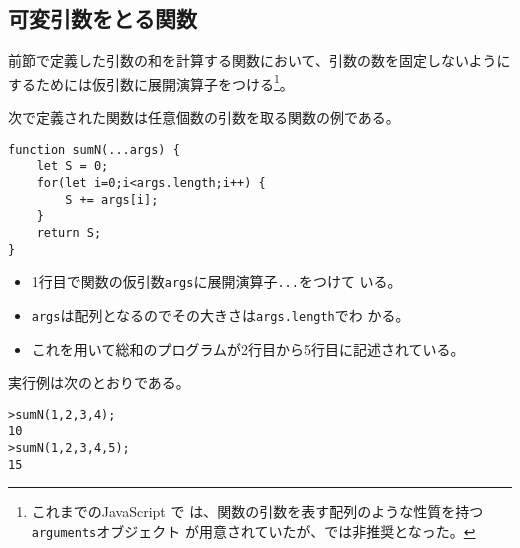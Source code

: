 \subsection{可変引数をとる関数}
前節で定義した引数の和を計算する関数において、引数の数を固定しないように
するためには仮引数に展開演算子をつける\footnote{これまでのJavaScript で
は、関数の引数を表す配列のような性質を持つ\texttt{arguments}オブジェクト
が用意されていたが、\ES では非推奨となった。}。
\begin{Exec}\upshape\label{DefOfFunctionwithIndefiniteArges}
次で定義された関数は任意個数の引数を取る関数の例である。
\begin{Verbatim}
function sumN(...args) {
    let S = 0;
    for(let i=0;i<args.length;i++) {
        S += args[i];
    }
    return S;
}
\end{Verbatim}
\begin{itemize}
 \item 1行目で関数の仮引数\texttt{args}に展開演算子\texttt{...}をつけて
       いる。
 \item \texttt{args}は配列となるのでその大きさは\texttt{args.length}でわ
       かる。
 \item これを用いて総和のプログラムが2行目から5行目に記述されている。
\end{itemize}
実行例は次のとおりである。
\begin{Verbatim}
>sumN(1,2,3,4);
10
>sumN(1,2,3,4,5);
15
\end{Verbatim}

\end{Exec}

\fi
